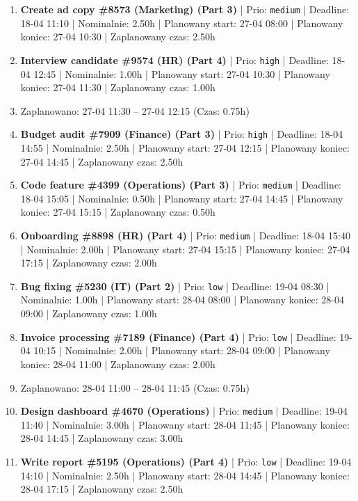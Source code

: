 {\begin{enumerate}
  \item [\textbf{14677}] \textbf{Create ad copy \#8573 (Marketing) (Part 3)} | Prio: \texttt{medium} | Deadline: 18-04 11:10 | Nominalnie: 2.50h | Planowany start: 27-04 08:00 | Planowany koniec: 27-04 10:30 | Zaplanowany czas: 2.50h
  \item [\textbf{14612}] \textbf{Interview candidate \#9574 (HR) (Part 4)} | Prio: \texttt{high} | Deadline: 18-04 12:45 | Nominalnie: 1.00h | Planowany start: 27-04 10:30 | Planowany koniec: 27-04 11:30 | Zaplanowany czas: 1.00h
  \item [\textbf{PRZERWA}] Zaplanowano: 27-04 11:30 -- 27-04 12:15 (Czas: 0.75h)
  \item [\textbf{14616}] \textbf{Budget audit \#7909 (Finance) (Part 3)} | Prio: \texttt{high} | Deadline: 18-04 14:55 | Nominalnie: 2.50h | Planowany start: 27-04 12:15 | Planowany koniec: 27-04 14:45 | Zaplanowany czas: 2.50h
  \item [\textbf{14664}] \textbf{Code feature \#4399 (Operations) (Part 3)} | Prio: \texttt{medium} | Deadline: 18-04 15:05 | Nominalnie: 0.50h | Planowany start: 27-04 14:45 | Planowany koniec: 27-04 15:15 | Zaplanowany czas: 0.50h
  \item [\textbf{14636}] \textbf{Onboarding \#8898 (HR) (Part 4)} | Prio: \texttt{medium} | Deadline: 18-04 15:40 | Nominalnie: 2.00h | Planowany start: 27-04 15:15 | Planowany koniec: 27-04 17:15 | Zaplanowany czas: 2.00h
  \item [\textbf{14680}] \textbf{Bug fixing \#5230 (IT) (Part 2)} | Prio: \texttt{low} | Deadline: 19-04 08:30 | Nominalnie: 1.00h | Planowany start: 28-04 08:00 | Planowany koniec: 28-04 09:00 | Zaplanowany czas: 1.00h
  \item [\textbf{14678}] \textbf{Invoice processing \#7189 (Finance) (Part 4)} | Prio: \texttt{low} | Deadline: 19-04 10:15 | Nominalnie: 2.00h | Planowany start: 28-04 09:00 | Planowany koniec: 28-04 11:00 | Zaplanowany czas: 2.00h
  \item [\textbf{PRZERWA}] Zaplanowano: 28-04 11:00 -- 28-04 11:45 (Czas: 0.75h)
  \item [\textbf{14676}] \textbf{Design dashboard \#4670 (Operations)} | Prio: \texttt{medium} | Deadline: 19-04 11:40 | Nominalnie: 3.00h | Planowany start: 28-04 11:45 | Planowany koniec: 28-04 14:45 | Zaplanowany czas: 3.00h
  \item [\textbf{14687}] \textbf{Write report \#5195 (Operations) (Part 4)} | Prio: \texttt{low} | Deadline: 19-04 14:10 | Nominalnie: 2.50h | Planowany start: 28-04 14:45 | Planowany koniec: 28-04 17:15 | Zaplanowany czas: 2.50h

\end{enumerate}}
